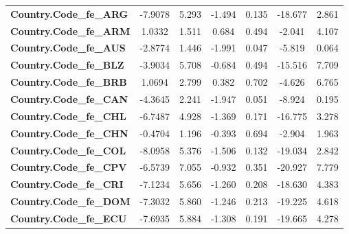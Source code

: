 \begin{center}
\begin{tabular}{lcccccc}
\textbf{Country.Code\_fe\_ARG}                            &      -7.9078  &        5.293     &    -1.494  &         0.135        &      -18.677    &        2.861     \\
\textbf{Country.Code\_fe\_ARM}                            &       1.0332  &        1.511     &     0.684  &         0.494        &       -2.041    &        4.107     \\
\textbf{Country.Code\_fe\_AUS}                            &      -2.8774  &        1.446     &    -1.991  &         0.047        &       -5.819    &        0.064     \\
\textbf{Country.Code\_fe\_BLZ}                            &      -3.9034  &        5.708     &    -0.684  &         0.494        &      -15.516    &        7.709     \\
\textbf{Country.Code\_fe\_BRB}                            &       1.0694  &        2.799     &     0.382  &         0.702        &       -4.626    &        6.765     \\
\textbf{Country.Code\_fe\_CAN}                            &      -4.3645  &        2.241     &    -1.947  &         0.051        &       -8.924    &        0.195     \\
\textbf{Country.Code\_fe\_CHL}                            &      -6.7487  &        4.928     &    -1.369  &         0.171        &      -16.775    &        3.278     \\
\textbf{Country.Code\_fe\_CHN}                            &      -0.4704  &        1.196     &    -0.393  &         0.694        &       -2.904    &        1.963     \\
\textbf{Country.Code\_fe\_COL}                            &      -8.0958  &        5.376     &    -1.506  &         0.132        &      -19.034    &        2.842     \\
\textbf{Country.Code\_fe\_CPV}                            &      -6.5739  &        7.055     &    -0.932  &         0.351        &      -20.927    &        7.779     \\
\textbf{Country.Code\_fe\_CRI}                            &      -7.1234  &        5.656     &    -1.260  &         0.208        &      -18.630    &        4.383     \\
\textbf{Country.Code\_fe\_DOM}                            &      -7.3032  &        5.860     &    -1.246  &         0.213        &      -19.225    &        4.618     \\
\textbf{Country.Code\_fe\_ECU}                            &      -7.6935  &        5.884     &    -1.308  &         0.191        &      -19.665    &        4.278     \\

\end{tabular}
\end{center}
